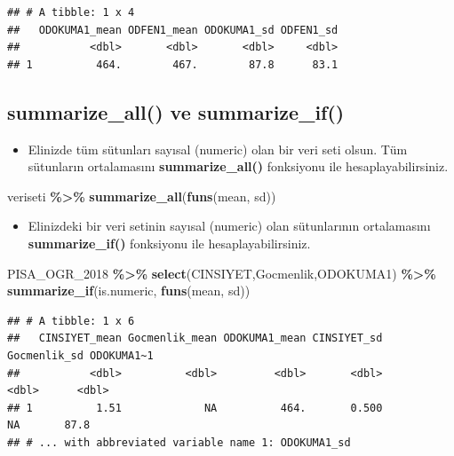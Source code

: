 \documentclass[
  oneside]{book}
\newenvironment{Shaded}{\begin{snugshade}}{\end{snugshade}}
\newcommand{\FunctionTok}[1]{\textcolor[rgb]{0.13,0.29,0.53}{\textbf{#1}}}
\newcommand{\NormalTok}[1]{#1}
\newcommand{\SpecialCharTok}[1]{\textcolor[rgb]{0.81,0.36,0.00}{\textbf{#1}}}
\providecommand{\tightlist}{%
  \setlength{\itemsep}{0pt}\setlength{\parskip}{0pt}}
\begin{document}
\begin{verbatim}
## # A tibble: 1 x 4
##   ODOKUMA1_mean ODFEN1_mean ODOKUMA1_sd ODFEN1_sd
##           <dbl>       <dbl>       <dbl>     <dbl>
## 1          464.        467.        87.8      83.1
\end{verbatim}

\hypertarget{summarize_all-ve-summarize_if}{%
\subsection{summarize\_all() ve summarize\_if()}\label{summarize_all-ve-summarize_if}}

\begin{itemize}
\tightlist
\item
  Elinizde tüm sütunları sayısal (numeric) olan bir veri seti olsun. Tüm sütunların ortalamasını \textbf{summarize\_all()} fonksiyonu ile hesaplayabilirsiniz.
\end{itemize}

\begin{Shaded}
\begin{Highlighting}[]
\NormalTok{veriseti }\SpecialCharTok{\%\textgreater{}\%} \FunctionTok{summarize\_all}\NormalTok{(}\FunctionTok{funs}\NormalTok{(mean, sd))}
\end{Highlighting}
\end{Shaded}

\begin{itemize}
\tightlist
\item
  Elinizdeki bir veri setinin sayısal (numeric) olan sütunlarının ortalamasını \textbf{summarize\_if()} fonksiyonu ile hesaplayabilirsiniz.
\end{itemize}

\begin{Shaded}
\begin{Highlighting}[]
\NormalTok{PISA\_OGR\_2018 }\SpecialCharTok{\%\textgreater{}\%} 
    \FunctionTok{select}\NormalTok{(CINSIYET,Gocmenlik,ODOKUMA1) }\SpecialCharTok{\%\textgreater{}\%} 
    \FunctionTok{summarize\_if}\NormalTok{(is.numeric, }\FunctionTok{funs}\NormalTok{(mean, sd))}
\end{Highlighting}
\end{Shaded}

\begin{verbatim}
## # A tibble: 1 x 6
##   CINSIYET_mean Gocmenlik_mean ODOKUMA1_mean CINSIYET_sd Gocmenlik_sd ODOKUMA1~1
##           <dbl>          <dbl>         <dbl>       <dbl>        <dbl>      <dbl>
## 1          1.51             NA          464.       0.500           NA       87.8
## # ... with abbreviated variable name 1: ODOKUMA1_sd
\end{verbatim}
\end{document}
